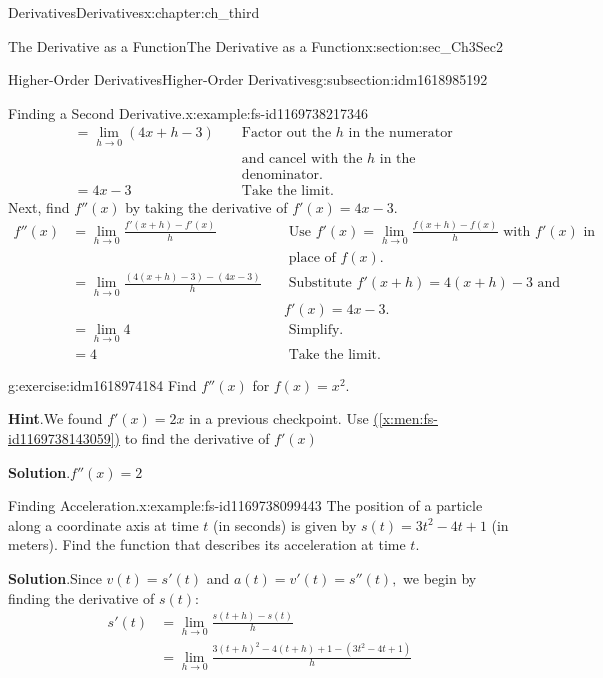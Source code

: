 \documentclass[oneside,10pt,]{book}
\newcommand{\blocktitlefont}{\relax}
\newcommand{\xreffont}{\relax}
\numberwithin{equation}{section}
\newcommand{\amp}{&}
\begin{document}
\begin{chapterptx}{Derivatives}{}{Derivatives}{}{}{x:chapter:ch_third}
\begin{sectionptx}{The Derivative as a Function}{}{The Derivative as a Function}{}{}{x:section:sec_Ch3Sec2}
\begin{subsectionptx}{Higher-Order Derivatives}{}{Higher-Order Derivatives}{}{}{g:subsection:idm1618985192}
\begin{example}{Finding a Second Derivative.}{x:example:fs-id1169738217346}
\begin{align*}
\amp=\lim_{h\to 0}(4x+h-3)\amp \amp\text{ Factor out the } h \text{ in the numerator }\\
\amp \amp \amp \text{ and cancel with the } h \text{ in the }\\
\amp \amp \amp \text{ denominator. }\\
\amp =4x-3\amp \amp\text{ Take the limit. }
\end{align*}
Next, find \(f''(x)\) by taking the derivative of \(f'(x)=4x-3.\)%
%
\begin{align*}
f''(x)\amp=\lim_{h\to 0}\frac{f'(x+h)-f'(x)}{h}\amp \amp \text{ Use } f'(x)=\lim_{h\to 0}\frac{f(x+h)-f(x)}{h} \text{ with } f'(x) \text{ in }\\
\amp \amp \amp \text{ place of } f(x).\\
\amp =\lim_{h\to 0}\frac{(4(x+h)-3)-(4x-3)}{h}\amp \amp\text{ Substitute } f'(x+h)=4(x+h)-3 \text{ and }\\
\amp \amp \amp f'(x)=4x-3.\\
\amp=\lim_{h\to 0}4\amp\amp \text{ Simplify. }\\
\amp =4\amp \amp\text{ Take the limit. }
\end{align*}
\end{example}
\begin{inlineexercise}{}{g:exercise:idm1618974184}%
Find \(f''(x)\) for \(f(x)=x^2.\)%
\par\smallskip%
\noindent\textbf{\blocktitlefont Hint}.\hypertarget{g:hint:idm1618975208}{}\quad{}We found \(f'(x)=2x\) in a previous checkpoint. Use \hyperref[x:men:fs-id1169738143059]{({\xreffont\ref{x:men:fs-id1169738143059}})} to find the derivative of \(f'(x)\)%
\par\smallskip%
\noindent\textbf{\blocktitlefont Solution}.\hypertarget{g:solution:idm1618967144}{}\quad{}\(f''(x)=2\)%
\end{inlineexercise}%
\begin{example}{Finding Acceleration.}{x:example:fs-id1169738099443}%
The position of a particle along a coordinate axis at time \(t\) (in seconds) is given by \(s(t)=3t^2-4t+1\) (in meters). Find the function that describes its acceleration at time \(t.\)%
\par\smallskip%
\noindent\textbf{\blocktitlefont Solution}.\hypertarget{g:solution:idm1618967912}{}\quad{}Since \(v(t)=s'(t)\) and \(a(t)=v'(t)=s''(t),\) we begin by finding the derivative of \(s(t):\)%
%
\begin{align*}
s'(t)\amp=\lim_{h\to 0}\frac{s(t+h)-s(t)}{h}\\
\amp=\lim_{h\to 0}\frac{3(t+h)^2-4(t+h)+1-(3t^2-4t+1)}{h}\\

\end{align*}
\end{example}
\end{subsectionptx}
\end{sectionptx}
\end{chapterptx}
\end{document}
